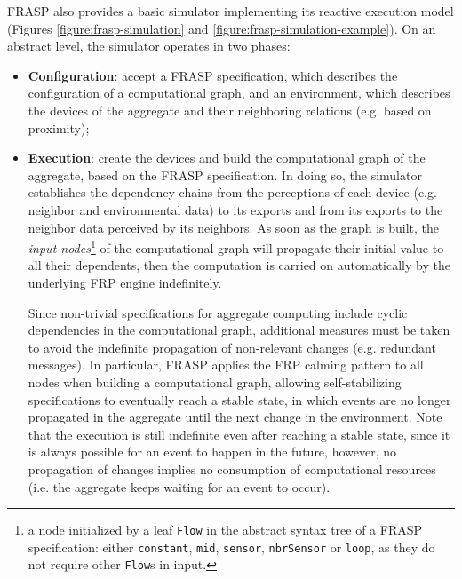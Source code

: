 FRASP also provides a basic simulator implementing its reactive execution model
(Figures \ref{figure:frasp-simulation} and
\ref{figure:frasp-simulation-example}). On an abstract level, the simulator
operates in two phases:
\begin{itemize}
  \item \textbf{Configuration}: accept a FRASP specification, which describes
        the configuration of a computational graph, and an environment, which
        describes the devices of the aggregate and their neighboring relations
        (e.g. based on proximity);
  \item \textbf{Execution}: create the devices and build the computational
        graph of the aggregate, based on the FRASP specification. In doing so,
        the simulator establishes the dependency chains from the perceptions of
        each device (e.g. neighbor and environmental data) to its exports and
        from its exports to the neighbor data perceived by its neighbors.
        As soon as the graph is built, the \textit{input nodes}\footnote{
          a node initialized by a leaf \texttt{Flow} in the abstract syntax
          tree of a FRASP specification: either \texttt{constant}, \texttt{mid},
          \texttt{sensor}, \texttt{nbrSensor} or \texttt{loop}, as they do not
          require other \texttt{Flow}s in input.
        } of the computational graph will propagate their initial value to all
        their dependents, then the computation is carried on automatically by
        the underlying \ac{FRP} engine indefinitely.

        Since non-trivial specifications for aggregate computing include cyclic
        dependencies in the computational graph, additional measures must be
        taken to avoid the indefinite propagation of non-relevant changes (e.g.
        redundant messages). In particular, FRASP applies the FRP calming
        pattern to all nodes when building a computational graph, allowing
        self-stabilizing specifications to eventually reach a stable state, in
        which events are no longer propagated in the aggregate until the next
        change in the environment. Note that the execution is still indefinite
        even after reaching a stable state, since it is always possible for an
        event to happen in the future, however, no propagation of changes
        implies no consumption of computational resources (i.e. the aggregate
        keeps waiting for an event to occur).
\end{itemize}

